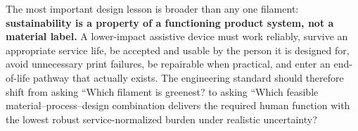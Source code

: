 \documentclass[11pt]{article}
\begin{document}
The most important design lesson is broader than any one filament: \textbf{sustainability is a property of a functioning product system, not a material label.} A lower-impact assistive device must work reliably, survive an appropriate service life, be accepted and usable by the person it is designed for, avoid unnecessary print failures, be repairable when practical, and enter an end-of-life pathway that actually exists. The engineering standard should therefore shift from asking ``Which filament is greenest? to asking ``Which feasible material--process--design combination delivers the required human function with the lowest robust service-normalized burden under realistic uncertainty?

\newpage
\printbibliography[title={References}]
\end{document}
